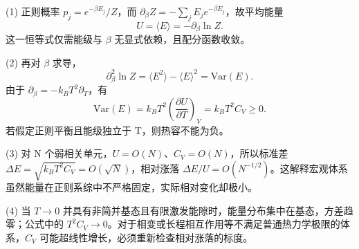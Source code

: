 (1) 正则概率 \(p_j=e^{-\beta E_j}/Z\)，而 \(\partial_\beta Z=-\sum_j E_je^{-\beta E_j}\)，故平均能量
\[
U=\langle E\rangle=-\partial_\beta\ln Z.
\]
这一恒等式仅需能级与 \(\beta \) 无显式依赖，且配分函数收敛。

(2) 再对 \(\beta \) 求导，
\[
\partial_\beta^2\ln Z
=\langle E^2\rangle-\langle E\rangle^2
=\mathrm{Var}(E).
\]
由于 \(\partial_\beta=-k_BT^2\partial_T\)，有
\[
\mathrm{Var}(E)=k_BT^2\left(\frac{\partial U}{\partial T}\right)_V
=k_BT^2C_V\ge0.
\]
若假定正则平衡且能级独立于 T，则热容不能为负。

(3) 对 N 个弱相关单元，\(U=O(N)\)、\(C_V=O(N)\)，所以标准差 \(\Delta E=\sqrt{k_BT^2C_V}=O(\sqrt N)\)，相对涨落 \(\Delta E/U=O(N^{-1/2})\)。这解释宏观体系虽然能量在正则系综中不严格固定，实际相对变化却极小。

(4) 当 \(T\to 0\) 并具有非简并基态且有限激发能隙时，能量分布集中在基态，方差趋零；公式中的 \(T^2C_V\to0\)。对于相变或长程相互作用等不满足普通热力学极限的体系，\(C_V\) 可能超线性增长，必须重新检查相对涨落的标度。
